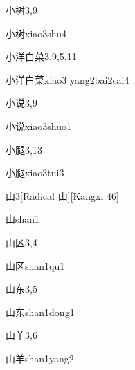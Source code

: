 \begin{entry}{小树}{3,9}
  \begin{phonetics}{小树}{xiao3shu4}
  \end{phonetics}
\end{entry}

\begin{entry}{小洋白菜}{3,9,5,11}
  \begin{phonetics}{小洋白菜}{xiao3 yang2bai2cai4}
  \end{phonetics}
\end{entry}

\begin{entry}{小说}{3,9}
  \begin{phonetics}{小说}{xiao3shuo1}
  \end{phonetics}
\end{entry}

\begin{entry}{小腿}{3,13}
  \begin{phonetics}{小腿}{xiao3tui3}
  \end{phonetics}
\end{entry}

\begin{entry}{山}{3}[Radical 山][Kangxi 46]
  \begin{phonetics}{山}{shan1}
  \end{phonetics}
\end{entry}

\begin{entry}{山区}{3,4}
  \begin{phonetics}{山区}{shan1qu1}
  \end{phonetics}
\end{entry}

\begin{entry}{山东}{3,5}
  \begin{phonetics}{山东}{shan1dong1}
  \end{phonetics}
\end{entry}

\begin{entry}{山羊}{3,6}
  \begin{phonetics}{山羊}{shan1yang2}
  \end{phonetics}
\end{entry}


